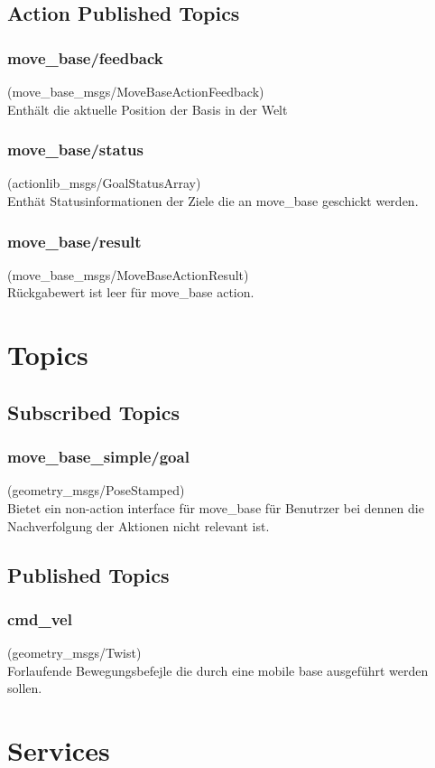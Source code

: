 \documentclass[oribibl]{llncs}
\begin{document}
\subsection{Action Published Topics}
\subsubsection{move\_base/feedback} (move\_base\_msgs/MoveBaseActionFeedback)\\
	Enthält die aktuelle Position der Basis in der Welt
\subsubsection{move\_base/status} (actionlib\_msgs/GoalStatusArray)\\
	Enthät Statusinformationen der Ziele die an move\_base geschickt werden.
\subsubsection{move\_base/result} (move\_base\_msgs/MoveBaseActionResult)\\
	Rückgabewert ist leer für move\_base action.
\section{Topics}
\subsection{Subscribed Topics}
\subsubsection{move\_base\_simple/goal} (geometry\_msgs/PoseStamped)\\
	Bietet ein non-action interface für move\_base für Benutrzer bei dennen die Nachverfolgung der Aktionen nicht relevant ist.
\subsection{Published Topics}
\subsubsection{cmd\_vel} (geometry\_msgs/Twist)\\
	Forlaufende Bewegungsbefejle die durch eine mobile base ausgeführt werden 	sollen.
	
\section{Services}
\end{document}

